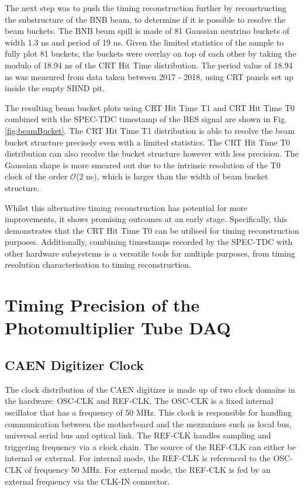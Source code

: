 The next step was to push the timing reconstruction further by reconstructing the substructure of the BNB beam, to determine if it is possible to resolve the beam buckets.
The BNB beam spill is made of 81 Gaussian neutrino buckets of width 1.3 ns and period of 19 ns.
Given the limited statistics of the sample to fully plot 81 buckets, the buckets were overlay on top of each other by taking the modulo of 18.94 ns of the CRT Hit Time distribution.
The period value of 18.94 ns was measured from data taken between 2017 - 2018, using CRT panels set up inside the empty SBND pit.

The resulting beam bucket plots using CRT Hit Time T1 and CRT Hit Time T0 combined with the SPEC-TDC timestamp of the BES signal are shown in Fig. \ref{fig:beamBucket}.
The CRT Hit Time T1 distribution is able to resolve the beam bucket structure precisely even with a limited statistics.
The CRT Hit Time T0 distribution can also resolve the bucket structure however with less precision. 
The Gaussian shape is more smeared out due to the intrinsic resolution of the T0 clock of the order $\mathcal{O}$(2 ns), which is larger than the width of beam bucket structure.

Whilst this alternative timing reconstruction has potential for more improvements, it shows promising outcomes at an early stage.
Specifically, this demonstrates that the CRT Hit Time T0 can be utilised for timing reconstruction purposes. 
Additionally, combining timestamps recorded by the SPEC-TDC with other hardware subsystems is a versatile tools for multiple purposes, from timing resolution characterisation to timing reconstruction.

\section{Timing Precision of the Photomultiplier Tube DAQ}
\label{sec4PMT}


\subsection{CAEN Digitizer Clock}
\label{subsec41PMT}
The clock distribution of the CAEN digitizer is made up of two clock domains in the hardware: OSC-CLK and REF-CLK.
The OSC-CLK is a fixed internal oscillator that has a frequency of 50 MHz. 
This clock is responsible for handling communication between the motherboard and the mezzanines such as local bus, universal serial bus and optical link.
The REF-CLK handles sampling and triggering frequency via a clock chain.
The source of the REF-CLK can either be internal or external.
For internal mode, the REF-CLK is referenced to the OSC-CLK of frequency 50 MHz.
For external mode, the REF-CLK is fed by an external frequency via the CLK-IN connector. 

